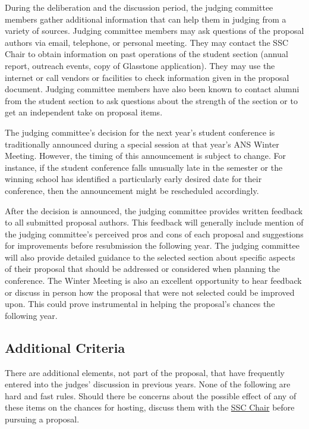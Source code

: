 \documentclass[12pt]{article}
\begin{document}
During the deliberation and the discussion period, the judging committee members gather additional information that can help them in judging from a variety of sources.
Judging committee members may ask questions of the proposal authors via email, telephone, or personal meeting.
They may contact the SSC Chair to obtain information on past operations of the student section (annual report, outreach events, copy of Glasstone application). They may use the internet or call vendors or facilities to check information given in the proposal document. Judging committee members have also been known to contact alumni from the student section to ask questions about the strength of the section or to get an independent take on proposal items.

The judging committee’s decision for the next year's student conference is traditionally announced during a special session at that year's ANS Winter Meeting.
However, the timing of this announcement is subject to change. For instance, if the student conference falls unusually late in the semester or the winning school has identified a particularly early desired date for their conference, then the announcement might be rescheduled accordingly.

After the decision is announced, the judging committee provides written feedback to all submitted proposal authors.
This feedback will generally include mention of the judging committee’s perceived pros and cons of each proposal and suggestions for improvements
before resubmission the following year.
The judging committee will also provide
detailed guidance to the selected section about specific aspects of their proposal that should be addressed or considered when planning the conference.
The Winter Meeting is also an excellent opportunity to hear feedback or discuss in person how the proposal that were not selected could be improved upon.
This could prove instrumental in helping the proposal's chances the following year.

\subsection{Additional Criteria}
There are additional elements, not part of the proposal, that have frequently entered into the judges’ discussion in previous years.
None of the following are hard and fast rules.
Should there be concerns about the possible effect of any of these items on the chances for hosting, discuss them with the \href{mailto:sscChair@gmail.com}{SSC Chair} before pursuing a proposal.
\end{document}
